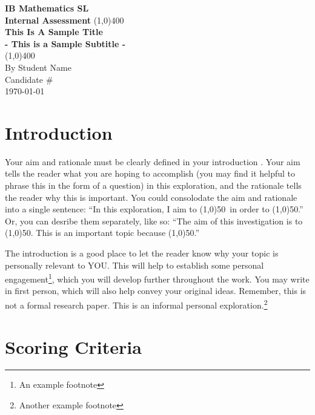 \documentclass[11pt, letterpaper]{article}
\begin{document}
\begin{titlepage}
\begin{center}
    \vspace*{1cm}
    \Large{\textbf{IB Mathematics SL}}\\
    \Large{\textbf{Internal Assessment}}
    \vfill %
    \line(1,0){400}\\[1mm]
    \huge{\textbf{This Is A Sample Title}}\\[3mm]
    \Large{\textbf{- This is a Sample Subtitle -}}\\[1mm]
    \line(1,0){400}\\
    \vfill
    By Student Name\\
    Candidate \# \\
    \today \\
\end{center}
\end{titlepage}

\tableofcontents
\thispagestyle{empty} %
\clearpage %

\setcounter{page}{1} %

\section{Introduction}
Your aim and rationale must be clearly defined in your introduction \cite{DBHS1}. Your aim tells the reader what you are hoping to accomplish (you may find it helpful to phrase this in the form of a question) in this exploration, and the rationale tells the reader why this is important. You could consolodate the aim and rationale into a single sentence: ``In this exploration, I aim to \line(1,0){50}\, in order to \line(1,0){50}.'' Or, you can desribe them separately, like so: ``The aim of this investigation is to \line(1,0){50}. This is an important topic because \line(1,0){50}.''

The introduction is a good place to let the reader know why your topic is personally relevant to YOU. This will help to establish some personal engagement\footnote{An example footnote}, which you will develop further throughout the work. You may write in first person, which will also help convey your original ideas. Remember, this is not a formal research paper. This is an informal personal exploration.\footnote{Another example footnote}

\section{Scoring Criteria}
\end{document}
